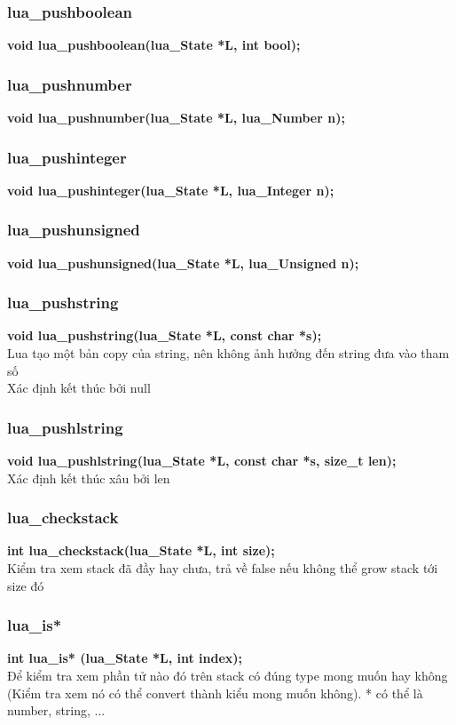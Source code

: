 \documentclass[12pt]{article}
\begin{document}
\subsubsection{lua\_pushboolean}
\textbf{void lua\_pushboolean(lua\_State *L, int bool);} 
\subsubsection{lua\_pushnumber}
\textbf{void lua\_pushnumber(lua\_State *L, lua\_Number n);} 
\subsubsection{lua\_pushinteger}
\textbf{void lua\_pushinteger(lua\_State *L, lua\_Integer n);}
\subsubsection{lua\_pushunsigned}
\textbf{void lua\_pushunsigned(lua\_State *L, lua\_Unsigned n);}
\subsubsection{lua\_pushstring}
\textbf{void lua\_pushstring(lua\_State *L, const char *s);} \\
Lua tạo một bản copy của string, nên không ảnh hưởng đến string đưa vào tham số \\
Xác định kết thúc bởi null
\subsubsection{lua\_pushlstring}
\textbf{void lua\_pushlstring(lua\_State *L, const char *s, size\_t len);} \\
Xác định kết thúc xâu bởi len
\subsubsection{lua\_checkstack}
\textbf{int lua\_checkstack(lua\_State *L, int size);} \\
Kiểm tra xem stack đã đầy hay chưa, trả về false nếu không thể grow stack tới size đó

\subsubsection{lua\_is*}
\textbf{int lua\_is* (lua\_State *L, int index);} \\
Để kiểm tra xem phần tử nào đó trên stack có đúng type mong muốn hay không (Kiểm tra xem nó có thể convert thành kiểu mong muốn không). * có thể là number, string, ...
\end{document}
